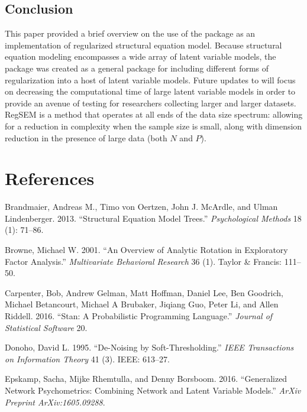 \documentclass[article]{jss}
\begin{document}
\subsection{Conclusion}\label{conclusion}

This paper provided a brief overview on the use of the 
package as an implementation of regularized structural equation model.
Because structural equation modeling encompasses a wide array of latent
variable models, the  package was created as a general
package for including different forms of regularization into a host of
latent variable models. Future updates to  will focus on
decreasing the computational time of large latent variable models in
order to provide an avenue of testing for researchers collecting larger
and larger datasets. RegSEM is a method that operates at all ends of the
data size spectrum: allowing for a reduction in complexity when the
sample size is small, along with dimension reduction in the presence of
large data (both \(N\) and \(P\)).

\section*{References}\label{references}

\hypertarget{refs}{}
\hypertarget{ref-brandmaier2013}{}
Brandmaier, Andreas M., Timo von Oertzen, John J. McArdle, and Ulman
Lindenberger. 2013. ``Structural Equation Model Trees.''
\emph{Psychological Methods} 18 (1): 71--86.

\hypertarget{ref-browne2001}{}
Browne, Michael W. 2001. ``An Overview of Analytic Rotation in
Exploratory Factor Analysis.'' \emph{Multivariate Behavioral Research}
36 (1). Taylor \& Francis: 111--50.

\hypertarget{ref-carpenter2016stan}{}
Carpenter, Bob, Andrew Gelman, Matt Hoffman, Daniel Lee, Ben Goodrich,
Michael Betancourt, Michael A Brubaker, Jiqiang Guo, Peter Li, and Allen
Riddell. 2016. ``Stan: A Probabilistic Programming Language.''
\emph{Journal of Statistical Software} 20.

\hypertarget{ref-donoho1995noising}{}
Donoho, David L. 1995. ``De-Noising by Soft-Thresholding.'' \emph{IEEE
Transactions on Information Theory} 41 (3). IEEE: 613--27.

\hypertarget{ref-epskamp2016generalized}{}
Epskamp, Sacha, Mijke Rhemtulla, and Denny Borsboom. 2016. ``Generalized
Network Psychometrics: Combining Network and Latent Variable Models.''
\emph{ArXiv Preprint ArXiv:1605.09288}.
\end{document}
